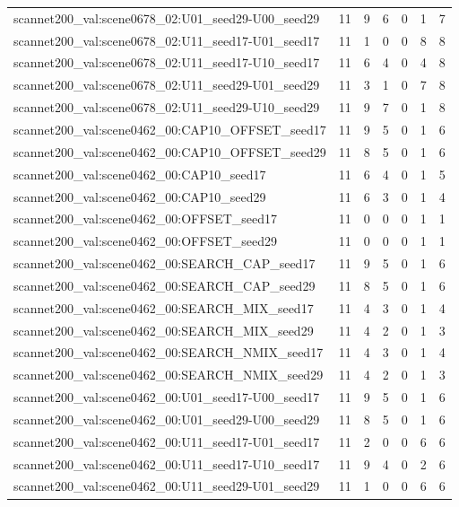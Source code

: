 \begin{table}[t]
\begin{tabular}{lrrrrrr}
scannet200\_val:scene0678\_02:U01\_seed29-U00\_seed29 & 11 & 9 & 6 & 0 & 1 & 7 \\
scannet200\_val:scene0678\_02:U11\_seed17-U01\_seed17 & 11 & 1 & 0 & 0 & 8 & 8 \\
scannet200\_val:scene0678\_02:U11\_seed17-U10\_seed17 & 11 & 6 & 4 & 0 & 4 & 8 \\
scannet200\_val:scene0678\_02:U11\_seed29-U01\_seed29 & 11 & 3 & 1 & 0 & 7 & 8 \\
scannet200\_val:scene0678\_02:U11\_seed29-U10\_seed29 & 11 & 9 & 7 & 0 & 1 & 8 \\
scannet200\_val:scene0462\_00:CAP10\_OFFSET\_seed17 & 11 & 9 & 5 & 0 & 1 & 6 \\
scannet200\_val:scene0462\_00:CAP10\_OFFSET\_seed29 & 11 & 8 & 5 & 0 & 1 & 6 \\
scannet200\_val:scene0462\_00:CAP10\_seed17 & 11 & 6 & 4 & 0 & 1 & 5 \\
scannet200\_val:scene0462\_00:CAP10\_seed29 & 11 & 6 & 3 & 0 & 1 & 4 \\
scannet200\_val:scene0462\_00:OFFSET\_seed17 & 11 & 0 & 0 & 0 & 1 & 1 \\
scannet200\_val:scene0462\_00:OFFSET\_seed29 & 11 & 0 & 0 & 0 & 1 & 1 \\
scannet200\_val:scene0462\_00:SEARCH\_CAP\_seed17 & 11 & 9 & 5 & 0 & 1 & 6 \\
scannet200\_val:scene0462\_00:SEARCH\_CAP\_seed29 & 11 & 8 & 5 & 0 & 1 & 6 \\
scannet200\_val:scene0462\_00:SEARCH\_MIX\_seed17 & 11 & 4 & 3 & 0 & 1 & 4 \\
scannet200\_val:scene0462\_00:SEARCH\_MIX\_seed29 & 11 & 4 & 2 & 0 & 1 & 3 \\
scannet200\_val:scene0462\_00:SEARCH\_NMIX\_seed17 & 11 & 4 & 3 & 0 & 1 & 4 \\
scannet200\_val:scene0462\_00:SEARCH\_NMIX\_seed29 & 11 & 4 & 2 & 0 & 1 & 3 \\
scannet200\_val:scene0462\_00:U01\_seed17-U00\_seed17 & 11 & 9 & 5 & 0 & 1 & 6 \\
scannet200\_val:scene0462\_00:U01\_seed29-U00\_seed29 & 11 & 8 & 5 & 0 & 1 & 6 \\
scannet200\_val:scene0462\_00:U11\_seed17-U01\_seed17 & 11 & 2 & 0 & 0 & 6 & 6 \\
scannet200\_val:scene0462\_00:U11\_seed17-U10\_seed17 & 11 & 9 & 4 & 0 & 2 & 6 \\
scannet200\_val:scene0462\_00:U11\_seed29-U01\_seed29 & 11 & 1 & 0 & 0 & 6 & 6 \\

\end{tabular}
\end{table}
